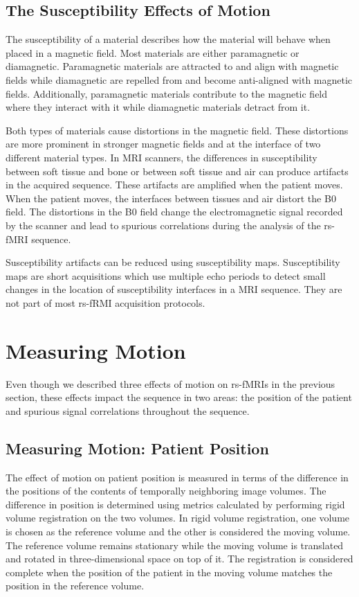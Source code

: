 \subsection{The Susceptibility Effects of Motion}

The susceptibility of a material describes how the material will behave when placed in a magnetic field. Most materials are either paramagnetic or diamagnetic. Paramagnetic materials are attracted to and align with magnetic fields while diamagnetic are repelled from and become anti-aligned with magnetic fields. Additionally, paramagnetic materials contribute to the magnetic field where they interact with it while diamagnetic materials detract from it. 

Both types of materials cause distortions in the magnetic field. These distortions are more prominent in stronger magnetic fields and at the interface of two different material types. In MRI scanners, the differences in susceptibility between soft tissue and bone or between soft tissue and air can produce artifacts in the acquired sequence. These artifacts are amplified when the patient moves. When the patient moves, the interfaces between tissues and air distort the B0 field. The distortions in the B0 field change the electromagnetic signal recorded by the scanner and lead to spurious correlations during the analysis of the rs-fMRI sequence.

Susceptibility artifacts can be reduced using susceptibility maps. Susceptibility maps are short acquisitions which use multiple echo periods to detect small changes in the location of susceptibility interfaces in a MRI sequence. They are not part of most rs-fRMI acquisition protocols.


\section{Measuring Motion}

Even though we described three effects of motion on rs-fMRIs in the previous section, these effects impact the sequence in two areas: the position of the patient and spurious signal correlations throughout the sequence.

\subsection{Measuring Motion: Patient Position} 

The effect of motion on patient position is measured in terms of the difference in the positions of the contents of temporally neighboring image volumes. The difference in position is determined using metrics calculated by performing rigid volume registration on the two volumes. 
In rigid volume registration, one volume is chosen as the reference volume and the other is considered the moving volume. The reference volume remains stationary while the moving volume is translated and rotated in three-dimensional space on top of it. The registration is considered complete when the position of the patient in the moving volume matches the position in the reference volume. %

